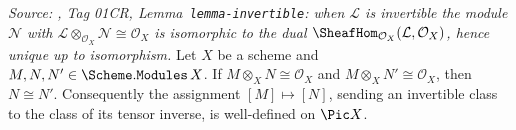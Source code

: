 \begin{lemma}\leanok
  \label{lem:isinvertible_inverse_welldef}
  \textit{Source: \cite{stacks-project}, Tag 01CR, Lemma~\texttt{lemma-invertible}: when
  \(\mathcal{L}\) is invertible the module \(\mathcal{N}\) with
  \(\mathcal{L} \otimes_{\mathcal{O}_X} \mathcal{N} \cong \mathcal{O}_X\) is
  isomorphic to the dual \(\SheafHom_{\mathcal{O}_X}(\mathcal{L}, \mathcal{O}_X)\),
  hence unique up to isomorphism.}
  Let \(X\) be a scheme and \(M, N, N' \in \Scheme.\mathtt{Modules}\,X\). If
  \(M \otimes_X N \cong \mathcal{O}_X\) and \(M \otimes_X N' \cong \mathcal{O}_X\),
  then \(N \cong N'\). Consequently the assignment \([M] \mapsto [N]\), sending an
  invertible class to the class of its tensor inverse, is well-defined on
  \(\Pic X\).
\end{lemma}

